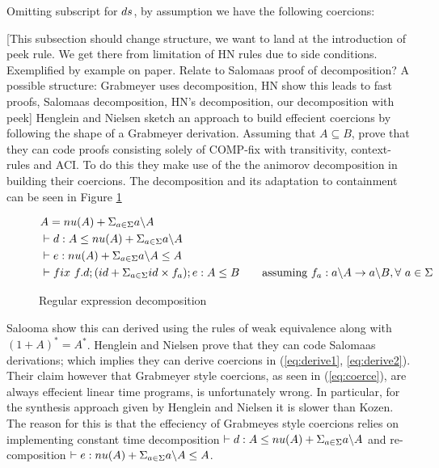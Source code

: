\documentclass[a4paper,UKenglish,cleveref, autoref, thm-restate]{lipics-v2021}
\begin{document}
Omitting subscript for $\dslcomm{ds}$, by assumption we have the following coercions:



[This subsection should change structure, we want to land at the introduction of peek rule. We get there from limitation of HN rules due to side conditions. Exemplified by example on paper. Relate to Salomaas proof of decomposition? A possible structure: Grabmeyer uses decomposition, HN show this leads to fast proofs, Salomaas decomposition, HN's decomposition, our decomposition with peek]
 Henglein and Nielsen sketch an approach to build effecient coercions by following the shape of a Grabmeyer derivation. Assuming that $A \subseteq B$,
 prove that they can code proofs consisting solely of COMP-fix with transitivity, context-rules and ACI. To do this they make use of the the animorov decomposition in building their coercions. The decomposition and its adaptation to containment can be seen in Figure \ref{fig:decomp}
 \begin{figure}
   \centering
   \begin{align}
&A = \mynu{A} + \Sigma_{a \in \Sigma} \derive{a}{A}\\
&\contains{}{d}{A}{\mynu{A} + \Sigma_{a \in \Sigma} \derive{a}{A}} \label{eq:derive1}\\
&\contains{}{e}{\mynu{A} + \Sigma_{a \in \Sigma} \derive{a}{A}}{A} \label{eq:derive2}\\
&\contains{}{\fix ~f.d;(id + \Sigma_{a \in \Sigma} id\times f_a); e}{A}{B} \qquad \text{assuming }f_a : \derive{a}{A} \rightarrow \derive{a}{B}, \forall ~ a \in \Sigma \label{eq:coerce}
   \end{align}
   \caption{Regular expression decomposition}
   \label{fig:decomp}
 \end{figure}
Salooma show this can derived using the rules of weak equivalence along with $(1 + A)^* = A^*$. Henglein and Nielsen prove that they can code Salomaas derivations; which implies they can derive coercions in (\ref{eq:derive1}, \ref{eq:derive2}). 
Their claim however that Grabmeyer style coercions, as seen in (\ref{eq:coerce}), are always effecient linear time programs, is unfortunately wrong. In particular, for the synthesis approach given by Henglein and Nielsen it is slower than Kozen. The reason for this is that the effeciency of Grabmeyes style coercions relies on implementing constant time decomposition $\contains{}{d}{A}{\mynu{A} + \Sigma_{a \in \Sigma} \derive{a}{A}}$ and re-composition $\contains{}{e}{\mynu{A} + \Sigma_{a \in \Sigma} \derive{a}{A}}{A}$.\\
\end{document}
